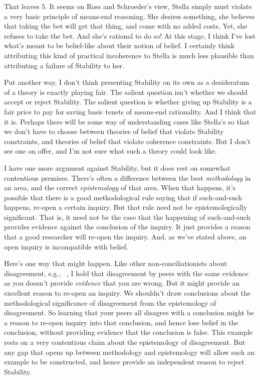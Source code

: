 That leaves 5. It seems on Ross and Schroeder's view, Stella simply must violate a very basic principle of means-end reasoning. She desires something, she believes that taking the bet will get that thing, and come with no added costs. Yet, she refuses to take the bet. And she's rational to do so! At this stage, I think I've lost what's meant to be belief-like about their notion of belief. I certainly think attributing this kind of practical incoherence to Stella is much less plausible than attributing a failure of Stability to her.

Put another way, I don't think presenting Stability on its own as a desideratum of a theory is exactly playing fair. The salient question isn't whether we should accept or reject Stability. The salient question is whether giving up Stability is a fair price to pay for saving basic tenets of means-end rationality. And I think that it is. Perhaps there will be some way of understanding cases like Stella's so that we don't have to choose between theories of belief that violate Stability constraints, and theories of belief that violate coherence constraints. But I don't see one on offer, and I'm not sure what such a theory could look like.

I have one more argument against Stability, but it does rest on somewhat contentious premises. There's often a difference between the best \emph{methodology} in an area, and the correct \emph{epistemology} of that area. When that happens, it's possible that there is a good methodological rule saying that if such-and-such happens, re-open a certain inquiry. But that rule need not be epistemologically significant. That is, it need not be the case that the happening of such-and-such provides evidence against the conclusion of the inquiry. It just provides a reason that a good researcher will re-open the inquiry. And, as we've stated above, an open inquiry is incompatible with belief.

Here's one way that might happen. Like other non-conciliationists about disagreement, e.g., ~\citep{Kelly2010-KELPDA}, I hold that disagreement by peers with the same evidence as you doesn't provide \emph{evidence} that you are wrong. But it might provide an excellent reason to re-open an inquiry. We shouldn't draw conclusions about the methodological significance of disagreement from the epistemology of disagreement. So learning that your peers all disagree with a conclusion might be a reason to re-open inquiry into that conclusion, and hence lose belief in the conclusion, without providing evidence that the conclusion is false. This example rests on a very contentious claim about the epistemology of disagreement. But any gap that opens up between methodology and epistemology will allow such an example to be constructed, and hence provide an independent reason to reject Stability.


